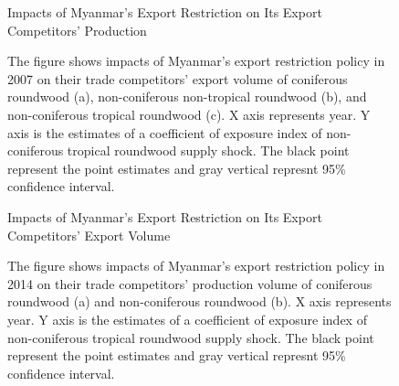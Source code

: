 \documentclass[a4paper,12pt]{article}
\begin{document}
\begin{figure}[htbp] 
    \centering
    \caption{Impacts of Myanmar's Export Restriction on Its Export Competitors' Production}
    \caption*{\small{The figure shows impacts of Myanmar's export restriction policy in 2007 on their trade competitors' export volume of coniferous roundwood (a), non-coniferous non-tropical roundwood (b), and non-coniferous tropical roundwood (c). X axis represents year. Y axis is the estimates of a coefficient of exposure index of non-coniferous tropical roundwood supply shock. The black point represent the point estimates and gray vertical represnt 95\% confidence interval.}}
    \label{fig:competitor_exp_Myanmar}
\end{figure}


\begin{figure}[htbp] 
    \centering
    \caption{Impacts of Myanmar's Export Restriction on Its Export Competitors' Export Volume}
    \caption*{\small{The figure shows impacts of Myanmar's export restriction policy in 2014 on their trade competitors' production volume of coniferous roundwood (a) and non-coniferous roundwood (b). X axis represents year. Y axis is the estimates of a coefficient of exposure index of non-coniferous tropical roundwood supply shock. The black point represent the point estimates and gray vertical represnt 95\% confidence interval.}}
    \label{fig:competitor_prod_Myanmar}
\end{figure}
\end{document}
